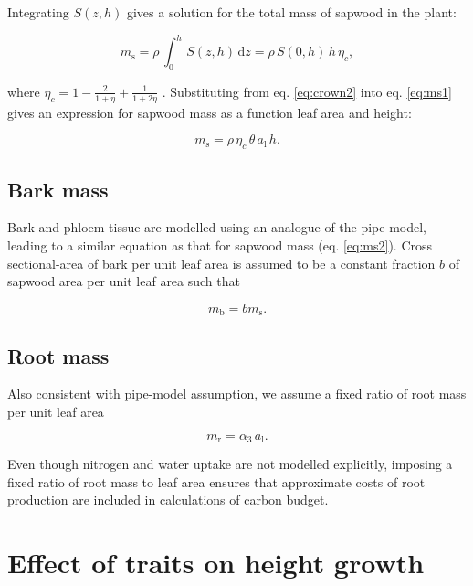 \documentclass[12pt, a4paper]{article}
\begin{document}
\begin{appendices}
Integrating $S(z,h)$ gives a solution for the total mass of sapwood in
the plant:

\begin{equation}\label{eq:ms1}
m_\textrm{s}=\rho \, \int_0^h \, S(z,h) \, \textrm{d}z= \rho \, S(0,h) \, h \, \eta_c, \end{equation}

where
$\eta_c=1-\frac{2}{1+\eta} + \frac{1}{1+2\eta}$ \citep{yokozawa-1995}.
Substituting from eq. \ref{eq:crown2} into eq. \ref{eq:ms1} gives an
expression for sapwood mass as a function leaf area and height:

\begin{equation}\label{eq:ms2}
m_\textrm{s}=\rho \, \eta_c \, \theta \, a_\textrm{l} \, h.
\end{equation}

\subsection{Bark mass}\label{bark-mass}

Bark and phloem tissue are modelled using an analogue of the pipe model,
leading to a similar equation as that for sapwood mass (eq.
\ref{eq:ms2}). Cross sectional-area of bark per unit leaf area is
assumed to be a constant fraction $b$ of sapwood area per unit leaf
area such that

\begin{equation}\label{eq:mb}
m_\textrm{b}=b m_\textrm{s}.
\end{equation}

\subsection{Root mass}\label{root-mass}

Also consistent with pipe-model assumption, we assume a fixed ratio of
root mass per unit leaf area

\begin{equation}\label{eq:mr}
m_\textrm{r}=\alpha_3 \, a_\textrm{l}.
\end{equation}

Even though nitrogen and water uptake are not modelled explicitly,
imposing a fixed ratio of root mass to leaf area ensures that
approximate costs of root production are included in calculations of
carbon budget.

\section{Effect of traits on height growth} \label{app:traits_max}


\end{appendices}
\end{document}
